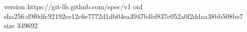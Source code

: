 version https://git-lfs.github.com/spec/v1
oid sha256:d9f0dfc92192ce12c6e7772d1db04ea3947b4bf837c052a0f2ddaa38bb508be7
size 349692
